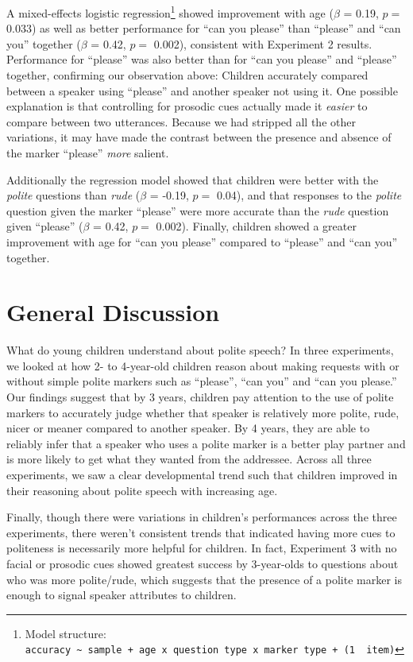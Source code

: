 \documentclass[10pt, letterpaper]{article}
\begin{document}
A mixed-effects logistic regression\footnote{Model structure:
  \texttt{accuracy\ \textasciitilde{}\ sample\ +\ age\ x\ question\ type\ x\ marker\ type\ +\ (1\ \textbar{}\ item)}}
showed improvement with age (\(\beta\) = 0.19, \(p =\) 0.033) as well as
better performance for ``can you please'' than ``please'' and ``can
you'' together (\(\beta\) = 0.42, \(p =\) 0.002), consistent with
Experiment 2 results. Performance for ``please'' was also better than
for ``can you please'' and ``please'' together, confirming our
observation above: Children accurately compared between a speaker using
``please'' and another speaker not using it. One possible explanation is
that controlling for prosodic cues actually made it \emph{easier} to
compare between two utterances. Because we had stripped all the other
variations, it may have made the contrast between the presence and
absence of the marker ``please'' \emph{more} salient.

Additionally the regression model showed that children were better with
the \emph{polite} questions than \emph{rude} (\(\beta\) = -0.19, \(p =\)
0.04), and that responses to the \emph{polite} question given the marker
``please'' were more accurate than the \emph{rude} question given
``please'' (\(\beta\) = 0.42, \(p =\) 0.002). Finally, children showed a
greater improvement with age for ``can you please'' compared to
``please'' and ``can you'' together.

\section{General Discussion}\label{general-discussion}

What do young children understand about polite speech? In three
experiments, we looked at how 2- to 4-year-old children reason about
making requests with or without simple polite markers such as
``please'', ``can you'' and ``can you please.'' Our findings suggest
that by 3 years, children pay attention to the use of polite markers to
accurately judge whether that speaker is relatively more polite, rude,
nicer or meaner compared to another speaker. By 4 years, they are able
to reliably infer that a speaker who uses a polite marker is a better
play partner and is more likely to get what they wanted from the
addressee. Across all three experiments, we saw a clear developmental
trend such that children improved in their reasoning about polite speech
with increasing age.

Finally, though there were variations in children's performances across
the three experiments, there weren't consistent trends that indicated
having more cues to politeness is necessarily more helpful for children.
In fact, Experiment 3 with no facial or prosodic cues showed greatest
success by 3-year-olds to questions about who was more polite/rude,
which suggests that the presence of a polite marker is enough to signal
speaker attributes to children.
\end{document}
